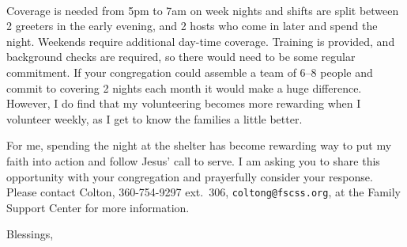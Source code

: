 \documentclass{letter}
\begin{document}
{\begin{letter}{
    	\Fullname\\
	\Address
    }
Coverage is needed from 5pm to 7am on week nights and shifts are split
between 2 greeters in the early evening, and 2 hosts who come in later
and spend the night. Weekends require additional day-time coverage.
Training is provided, and background checks are required, so there would
need to be some regular commitment. If your congregation could assemble
a team of 6--8 people and commit to covering 2 nights each month it
would make a huge difference. However, I do find that my volunteering
becomes more rewarding when I volunteer weekly, as I get to know the
families a little better.

For me, spending the night at the shelter has become rewarding way to
put my faith into action and follow Jesus' call to serve. I am asking
you to share this opportunity with your congregation and prayerfully
consider your response. Please contact Colton, 360-754-9297 ext.~306, \texttt{coltong@fscss.org}, at the Family Support Center for more information.

\closing{Blessings,}
\end{letter}
}
\end{document}

